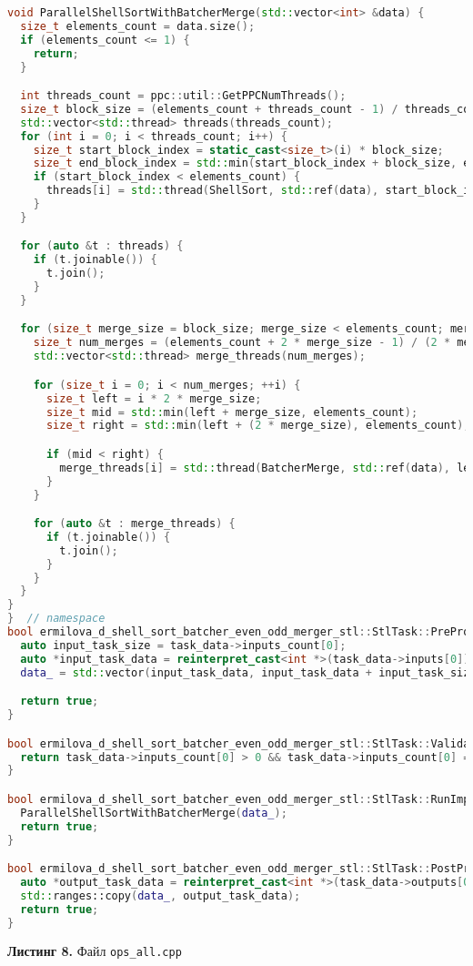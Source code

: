 \documentclass[a4paper,12pt]{article}
\begin{document}
\begin{lstlisting}[language=C++]
void ParallelShellSortWithBatcherMerge(std::vector<int> &data) {
  size_t elements_count = data.size();
  if (elements_count <= 1) {
    return;
  }

  int threads_count = ppc::util::GetPPCNumThreads();
  size_t block_size = (elements_count + threads_count - 1) / threads_count;
  std::vector<std::thread> threads(threads_count);
  for (int i = 0; i < threads_count; i++) {
    size_t start_block_index = static_cast<size_t>(i) * block_size;
    size_t end_block_index = std::min(start_block_index + block_size, elements_count) - 1;
    if (start_block_index < elements_count) {
      threads[i] = std::thread(ShellSort, std::ref(data), start_block_index, end_block_index);
    }
  }

  for (auto &t : threads) {
    if (t.joinable()) {
      t.join();
    }
  }

  for (size_t merge_size = block_size; merge_size < elements_count; merge_size *= 2) {
    size_t num_merges = (elements_count + 2 * merge_size - 1) / (2 * merge_size);
    std::vector<std::thread> merge_threads(num_merges);

    for (size_t i = 0; i < num_merges; ++i) {
      size_t left = i * 2 * merge_size;
      size_t mid = std::min(left + merge_size, elements_count);
      size_t right = std::min(left + (2 * merge_size), elements_count);

      if (mid < right) {
        merge_threads[i] = std::thread(BatcherMerge, std::ref(data), left, mid, right);
      }
    }

    for (auto &t : merge_threads) {
      if (t.joinable()) {
        t.join();
      }
    }
  }
}
}  // namespace
bool ermilova_d_shell_sort_batcher_even_odd_merger_stl::StlTask::PreProcessingImpl() {
  auto input_task_size = task_data->inputs_count[0];
  auto *input_task_data = reinterpret_cast<int *>(task_data->inputs[0]);
  data_ = std::vector(input_task_data, input_task_data + input_task_size);

  return true;
}

bool ermilova_d_shell_sort_batcher_even_odd_merger_stl::StlTask::ValidationImpl() {
  return task_data->inputs_count[0] > 0 && task_data->inputs_count[0] == task_data->outputs_count[0];
}

bool ermilova_d_shell_sort_batcher_even_odd_merger_stl::StlTask::RunImpl() {
  ParallelShellSortWithBatcherMerge(data_);
  return true;
}

bool ermilova_d_shell_sort_batcher_even_odd_merger_stl::StlTask::PostProcessingImpl() {
  auto *output_task_data = reinterpret_cast<int *>(task_data->outputs[0]);
  std::ranges::copy(data_, output_task_data);
  return true;
}
\end{lstlisting}
\textbf{Листинг 8.} Файл \texttt{ops\_all.cpp}
\end{document}
